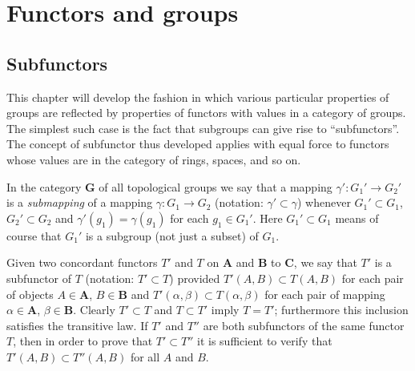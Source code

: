 \documentclass[11pt,a4paper]{report}
\begin{document}
\chapter{Functors and groups}\label{ch:funct_groups}
\section{Subfunctors}\label{sec:subfun}
This chapter will develop the fashion in which various particular properties of groups are reflected by properties of functors with
values in a category of groups. The simplest such case is the fact that subgroups can give rise to ``subfunctors''. The concept of
subfunctor thus developed applies with equal force to functors whose values are in the category of rings, spaces, and so on.

In the category $\mathbf{G}$ of all topological groups we say that a mapping $\gamma':G_1'\rightarrow G_2'$ is a \emph{submapping}
of a mapping $\gamma:G_1\rightarrow G_2$ (notation: $\gamma'\subset\gamma$) whenever $G_1'\subset G_1$, $G_2'\subset G_2$ and
$\gamma'(g_1)=\gamma(g_1)$ for each $g_1\in G_1'$. Here $G_1'\subset G_1$ means of course that $G_1'$ is a subgroup (not just a
subset) of $G_1$.

Given two concordant functors $T'$ and $T$ on $\mathbf{A}$ and $\mathbf{B}$ to $\mathbf{C}$, we say that $T'$ is a subfunctor
of $T$ (notation: $T'\subset T$) provided $T'(A,B)\subset T(A,B)$ for each pair of objects $A\in\mathbf{A}$, $B\in\mathbf{B}$ and
$T'(\alpha,\beta)\subset T(\alpha,\beta)$ for each pair of mapping $\alpha\in\mathbf{A}$, $\beta\in\mathbf{B}$. Clearly $T'\subset
T$ and $T\subset T'$ imply $T=T'$; furthermore this inclusion satisfies the transitive law. If $T'$ and $T''$ are both subfunctors of
the same functor $T$, then in order to prove that $T'\subset T''$ it is sufficient to verify that $T'(A,B)\subset T''(A,B)$ for all
$A$ and $B$.
\end{document}
